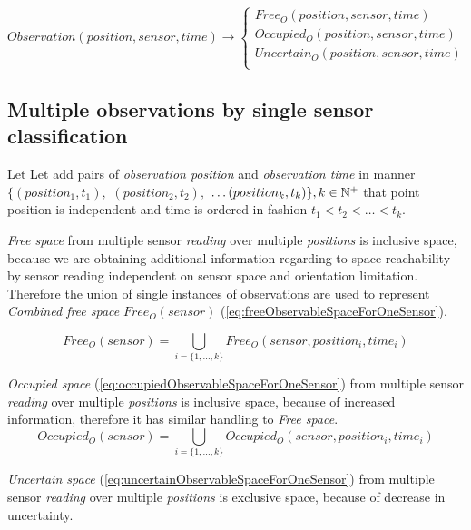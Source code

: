     \begin{equation}\label{eq:observationClassification}
        Observation(position,sensor,time)\to
        \begin{cases}
            Free_O(position,sensor,time)\\
            Occupied_O(position,sensor,time)\\
            Uncertain_O(position,sensor,time)\\
        \end{cases}
    \end{equation}


\subsection{Multiple observations by single sensor classification}\label{multipleObservationsBySingleSensor}
    \noindent Let Let add pairs of \emph{observation position} and \emph{observation time} in manner $\{(position_1,t_1),$ $(position_2,t_2),$ $\dots(position_k,t_k)\}, k\in\mathbb{N}^+$ that point position is independent and time is ordered in fashion $t_1 < t_2 < \dots < t_k$.
 
 
    \emph{Free space} from multiple sensor \emph{reading} over multiple \emph{positions} is inclusive space, because we are obtaining additional information regarding to space reachability by sensor reading independent on sensor space and orientation limitation. Therefore the union of single instances of observations are used to represent \emph{Combined free space} $Free_O(sensor)$ (\ref{eq:freeObservableSpaceForOneSensor}).

    \begin{equation}\label{eq:freeObservableSpaceForOneSensor}
        Free_O(sensor)= \bigcup_{i=\{1,\dots,k\}}Free_O(sensor,position_i,time_i)
    \end{equation}
 
    \emph{Occupied space} (\ref{eq:occupiedObservableSpaceForOneSensor}) from multiple sensor \emph{reading} over multiple \emph{positions} is inclusive space, because of increased information, therefore it has similar handling to \emph{Free space}.
    \begin{equation}\label{eq:occupiedObservableSpaceForOneSensor}
        Occupied_O(sensor)= \bigcup_{i=\{1,\dots,k\}}Occupied_O(sensor,position_i,time_i)
    \end{equation}
 
    \emph{Uncertain space} (\ref{eq:uncertainObservableSpaceForOneSensor}) from multiple sensor \emph{reading} over multiple \emph{positions} is exclusive space, because of decrease in uncertainty. 
 
